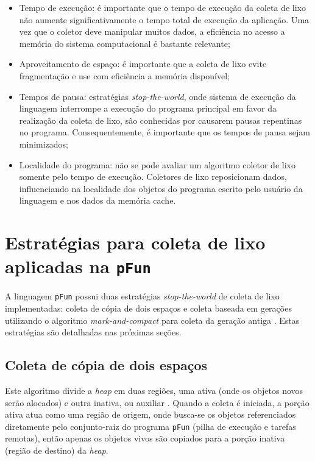 \documentclass[ccc, pg2]{esinucpel}
\begin{document}
\begin{itemize}
\item Tempo de execução: é importante que o tempo de execução da coleta de lixo não aumente significativamente o tempo total de execução da aplicação. Uma vez que o coletor deve manipular muitos dados, a eficiência no acesso a memória do sistema computacional é bastante relevante;

\item Aproveitamento de espaço: é importante que a coleta de lixo evite fragmentação e use com eficiência a memória disponível;

\item Tempos de pausa: estratégias \textit{stop-the-world}, onde sistema de execução da linguagem interrompe a execução do programa principal em favor da realização da coleta de lixo, são conhecidas por causarem pausas repentinas no programa. Consequentemente, é importante que os tempos de pausa sejam minimizados;

\item Localidade do programa: não se pode avaliar um algoritmo coletor de lixo somente pelo tempo de execução. Coletores de lixo reposicionam dados, influenciando na localidade dos objetos do programa escrito pelo usuário da linguagem e nos dados da memória cache.
\end{itemize}


\section{Estratégias para coleta de lixo aplicadas na \texttt{pFun}} \label{sec:gcpfun}
A linguagem \texttt{pFun} possui duas estratégias \textit{stop-the-world} de coleta de lixo implementadas: coleta de cópia de dois espaços \cite{bib:dubois:pfun} e coleta baseada em gerações utilizando o algoritmo \textit{mark-and-compact} para coleta da geração antiga \cite{bib:beloni}. Estas estratégias são detalhadas nas próximas seções.

\subsection{Coleta de cópia de dois espaços} \label{sec:twospace}
Este algoritmo divide a \textit{heap} em duas regiões, uma ativa (onde os objetos novos serão alocados) e outra inativa, ou auxiliar \cite{bib:samsom:gengc}. Quando a coleta é iniciada, a porção ativa atua como uma região de origem, onde busca-se os objetos referenciados diretamente pelo conjunto-raiz do programa \texttt{pFun} (pilha de execução e tarefas remotas), então apenas os objetos vivos são copiados para a porção inativa (região de destino) da {\it heap}.
\end{document}
